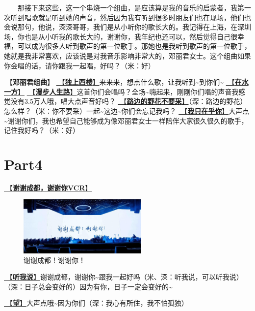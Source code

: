 \documentclass[]{ctexbook}
\begin{document}
  那接下来这些，这一个串烧一个组曲，是应该算是我的音乐的启蒙者，我第一次听到唱歌就是听到她的声音，然后因为我有听到很多时朋友们也在现场，他们也会说那句，他说，深深哥哥，我们是从小听你的歌长大的。我记得在上海，在深圳场，你也是从小听我的歌长大的，谢谢你，我年纪也还可以，然后觉得自己很幸福，可以成为很多人听到歌声的第一位歌手。那她也是我听到歌声的第一位歌手，她就是我非常喜欢，应该说是对我音乐影响非常大的，邓丽君女士。这个组曲如果你会唱的话，请你跟我一起唱，好吗？（米：好）

🎵【\textbf{邓丽君组曲}】
\hyperref[one-in-the-building]{🎵【\textbf{独上西楼}】}来来来，想点什么歌，让我听到\textasciitilde 到你们\textasciitilde{}
\hyperref[on-the-water-side]{🎵【\textbf{在水一方}】}
\hyperref[walk-the-road-of-life]{🎵【\textbf{漫步人生路}】}这首你们会唱吗？全场\textasciitilde 嗨起来，刚刚你们唱的声音我感觉没有3.5万人哦，唱大点声音好吗？
\hyperref[only-with-me]{🎵【\textbf{路边的野花不要采}】}（深：路边的野花）怎么样？（米：你不要采）一起\textasciitilde 这边\textasciitilde 你们会忘记我吗？
\hyperref[only-you]{🎵【\textbf{我只在乎你}】}大声点\textasciitilde 谢谢你们，我也希望自己能够成为像邓丽君女士一样陪伴大家很久很久的歌手，记住我好吗？（米：好）

\section{Part4}\label{chengdu-20240615-part4}

\hyperref[thank-you-vcr]{🎥【\textbf{谢谢成都，谢谢你VCR}】}

\begin{figure}

{\centering \includegraphics[width=180pt]{img/chengdu20240615/thank-chengdu} 

}

\caption{谢谢成都！谢谢你！}\label{fig:unnamed-chunk-46}
\end{figure}

\hyperref[listen-to-me]{🎵【\textbf{听我说}】}谢谢成都，谢谢你\textasciitilde 跟我一起好吗（米、深：听我说，可以听我说）（深：日子总会变好的）因为有你，日子一定会变好的\textasciitilde{}

\hyperref[hope]{🎵【\textbf{望}】}大声点哦\textasciitilde 因为你们（深：我心有所住，我不怕孤独）
\end{document}
